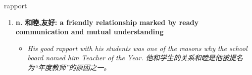 
\begin{frame}
{\huge rapport}
\begin{center}
\begin{enumerate}\Large
  \item \textbf{n. 和睦,友好: a friendly relationship marked by ready communication and mutual understanding}
  \begin{itemize}
    \item \em{\Large{His good rapport with his students was one of the reasons why the school board named him Teacher of the Year. 他和学生的关系和睦是他被提名为“年度教师”的原因之一。}}
  \end{itemize}
\end{enumerate}
\end{center}
\end{frame}
